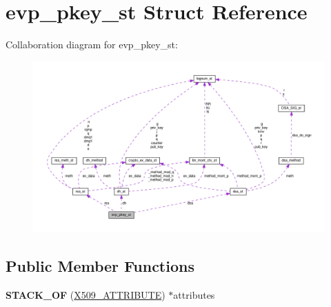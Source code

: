 \hypertarget{structevp__pkey__st}{}\section{evp\+\_\+pkey\+\_\+st Struct Reference}
\label{structevp__pkey__st}


Collaboration diagram for evp\+\_\+pkey\+\_\+st\+:
\nopagebreak
\begin{figure}[H]
\begin{center}
\leavevmode
\includegraphics[width=350pt]{structevp__pkey__st__coll__graph}
\end{center}
\end{figure}
\subsection*{Public Member Functions}
\begin{DoxyCompactItemize}
\item 
\mbox{\label{structevp__pkey__st_a1566b6f371f8086a57f9e2405addb749}} 
{\bfseries S\+T\+A\+C\+K\+\_\+\+OF} (\hyperlink{structx509__attributes__st}{X509\+\_\+\+A\+T\+T\+R\+I\+B\+U\+TE}) $\ast$attributes
\end{DoxyCompactItemize}
